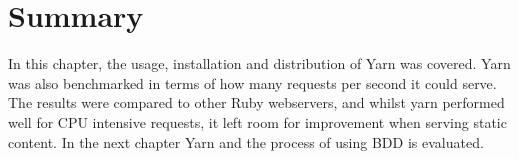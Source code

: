 \section{Summary}
In this chapter, the usage, installation and distribution of Yarn was covered.
Yarn was also benchmarked in terms of how many requests per second it could
serve. The results were compared to other Ruby webservers, and whilst yarn
performed well for CPU intensive requests, it left room for improvement when
serving static content. In the next chapter Yarn and the process of using BDD
is evaluated.
